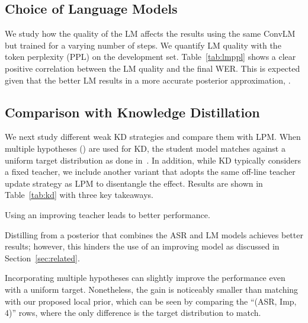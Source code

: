 \subsection{Choice of Language Models}

We study how the quality of the LM affects the results using the same ConvLM but trained for a varying number of steps.
We quantify LM quality with the token perplexity (PPL) on the development set.
Table~\ref{tab:lmppl} shows a clear positive correlation between the LM quality and the final WER. This is expected given that the better LM results in a more accurate posterior approximation, .

\subsection{Comparison with Knowledge Distillation}
We next study different weak KD strategies and compare them with LPM. When multiple hypotheses () are used for KD, the student model matches against a uniform target distribution as done in~\citet{kahn2019self}. In addition, while KD typically considers a fixed teacher, we include another variant that adopts the same off-line teacher update strategy as LPM to disentangle the effect.
Results are shown in Table~\ref{tab:kd} with three key takeaways.
\begin{enumerate*}[label=(\arabic*)]
    \item Using an improving teacher leads to better performance.
    \item Distilling from a posterior that combines the ASR and LM models achieves better results; however, this hinders the use of an improving model as discussed in Section~\ref{sec:related}.
    \item Incorporating multiple hypotheses can slightly improve the performance even with a uniform target. Nonetheless, the gain is noticeably smaller than matching with our proposed local prior, which can be seen by comparing the ``(ASR, Imp, 4)'' rows, where the only difference is the target distribution to match.
\end{enumerate*}

